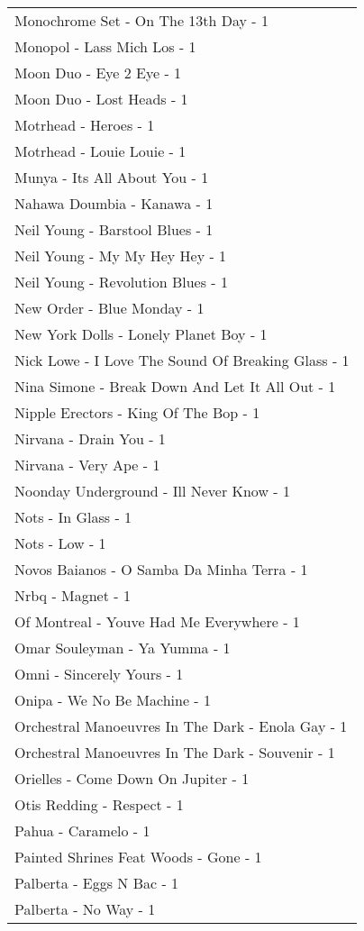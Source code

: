 \documentclass[
]{article}
\begin{document}
\begin{longtable}{l}
Monochrome Set - On The 13th Day - 1 \\ 
Monopol - Lass Mich Los - 1 \\ 
Moon Duo - Eye 2 Eye - 1 \\ 
Moon Duo - Lost Heads - 1 \\ 
Motrhead - Heroes - 1 \\ 
Motrhead - Louie Louie - 1 \\ 
Munya - Its All About You - 1 \\ 
Nahawa Doumbia - Kanawa - 1 \\ 
Neil Young - Barstool Blues - 1 \\ 
Neil Young - My My Hey Hey - 1 \\ 
Neil Young - Revolution Blues - 1 \\ 
New Order - Blue Monday - 1 \\ 
New York Dolls - Lonely Planet Boy - 1 \\ 
Nick Lowe - I Love The Sound Of Breaking Glass - 1 \\ 
Nina Simone - Break Down And Let It All Out - 1 \\ 
Nipple Erectors - King Of The Bop - 1 \\ 
Nirvana - Drain You - 1 \\ 
Nirvana - Very Ape - 1 \\ 
Noonday Underground - Ill Never Know - 1 \\ 
Nots - In Glass - 1 \\ 
Nots - Low - 1 \\ 
Novos Baianos - O Samba Da Minha Terra - 1 \\ 
Nrbq - Magnet - 1 \\ 
Of Montreal - Youve Had Me Everywhere - 1 \\ 
Omar Souleyman - Ya Yumma - 1 \\ 
Omni - Sincerely Yours - 1 \\ 
Onipa - We No Be Machine - 1 \\ 
Orchestral Manoeuvres In The Dark - Enola Gay - 1 \\ 
Orchestral Manoeuvres In The Dark - Souvenir - 1 \\ 
Orielles - Come Down On Jupiter - 1 \\ 
Otis Redding - Respect - 1 \\ 
Pahua - Caramelo - 1 \\ 
Painted Shrines Feat Woods - Gone - 1 \\ 
Palberta - Eggs N Bac - 1 \\ 
Palberta - No Way - 1 \\ 

\end{longtable}
\end{document}
